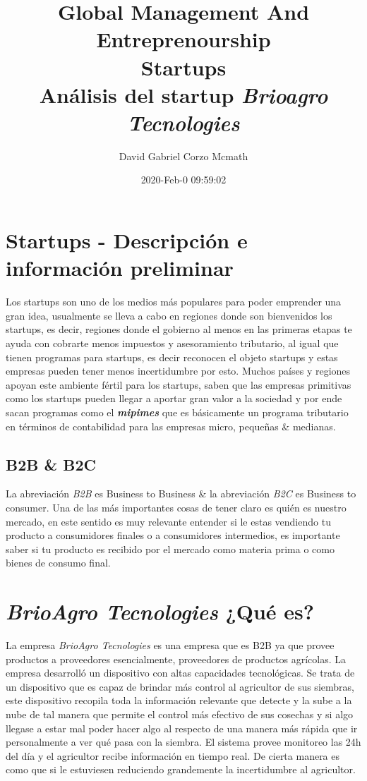 \documentclass{article}
\title{\Huge Global Management And Entreprenourship \\ Startups \\ Análisis del startup \emph{Brioagro Tecnologies}}
\author{David Gabriel Corzo Mcmath}
\date{2020-Feb-0 09:59:02}
\begin{document}
\maketitle

\section{Startups - Descripción e información preliminar}
Los startups son uno de los medios más populares para poder emprender una gran idea, usualmente se lleva a cabo en regiones donde son bienvenidos los startups, es decir, regiones donde el gobierno al menos en las primeras etapas te ayuda con cobrarte menos impuestos y asesoramiento tributario, al igual que tienen programas para startups, es decir reconocen el objeto startups y estas empresas pueden tener menos incertidumbre por esto. Muchos países y regiones apoyan este ambiente fértil para los startups, saben que las empresas primitivas como los startups pueden llegar a aportar gran valor a la sociedad y por ende sacan programas como el \emph{\textbf{mipimes}} que es básicamente un programa tributario en términos de contabilidad para las empresas micro, pequeñas \& medianas.

\subsection{B2B \& B2C}
La abreviación \emph{B2B} es Business to Business \& la abreviación \emph{B2C} es Business to consumer. Una de las más importantes cosas de tener claro es quién es nuestro mercado, en este sentido es muy relevante entender si le estas vendiendo tu producto a consumidores finales o a consumidores intermedios, es importante saber si tu producto es recibido por el mercado como materia prima o como bienes de consumo final.


\section{\emph{BrioAgro Tecnologies} ¿Qué es?}
La empresa \emph{BrioAgro Tecnologies} es una empresa que es B2B ya que provee productos a proveedores esencialmente, proveedores de productos agrícolas. La empresa desarrolló un dispositivo con altas capacidades tecnológicas. Se trata de un dispositivo que es capaz de brindar más control al agricultor de sus siembras, este dispositivo recopila toda la información relevante que detecte y la sube a la nube de tal manera que permite el control más efectivo de sus cosechas y si algo llegase a estar mal poder hacer algo al respecto de una manera más rápida que ir personalmente a ver qué pasa con la siembra.
\newline 
El sistema provee monitoreo las 24h del día y el agricultor recibe información en tiempo real. De cierta manera es como que si le estuviesen reduciendo grandemente la incertidumbre al agricultor.
\end{document}

